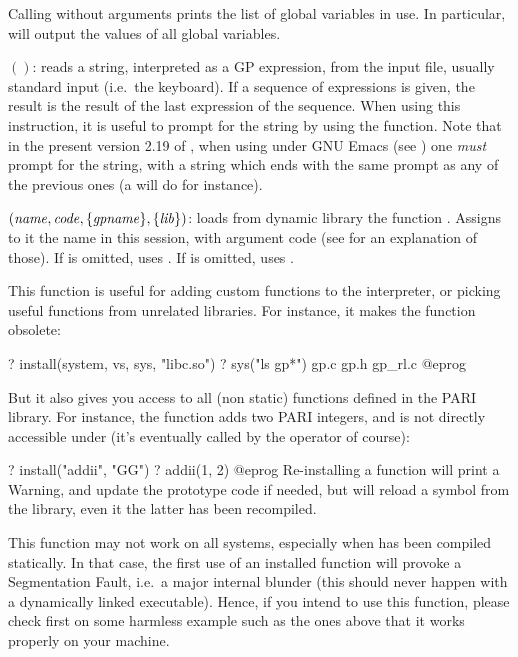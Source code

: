 Calling  without arguments prints the list of global variables in
use. In particular,  will output the values of all global
variables.

$()$: reads a string, interpreted as a GP expression,
from the input file, usually standard input (i.e.~the keyboard). If a
sequence of expressions is given, the result is the result of the last
expression of the sequence. When using this instruction, it is useful to
prompt for the string by using the  function. Note that in the
present version 2.19 of , when using  under GNU Emacs (see
) one \emph{must} prompt for the string, with a string
which ends with the same prompt as any of the previous ones (a 
will do for instance).

$(\hbox{\it name\/},\hbox{\it code\/},\{\hbox{\it gpname\/}\},\{\hbox{\it lib\/}\})$:
loads from dynamic library  the function . Assigns to it
the name  in this  session, with argument code  (see
 for an explanation of those). If  is
omitted, uses . If  is omitted, uses
.\label{se:install}

This function is useful for adding custom functions to the  interpreter,
or picking useful functions from unrelated libraries. For instance, it
makes the function  obsolete:

\bprog
? install(system, vs, sys, "libc.so")
? sys("ls gp*")
gp.c            gp.h            gp_rl.c
@eprog

But it also gives you access to all (non static) functions defined in the
PARI library. For instance, the function  adds
two PARI integers, and is not directly accessible under  (it's eventually
called by the \kbd{+} operator of course):

\bprog
? install("addii", "GG")
? addii(1, 2)
@eprog
Re-installing a function will print a Warning, and update the prototype code
if needed, but will reload a symbol from the library, even it the latter has
been recompiled.

 This function may not work on all systems, especially
when  has been compiled statically. In that case, the first use of an
installed function will provoke a Segmentation Fault, i.e.~a major internal
blunder (this should never happen with a dynamically linked executable).
Hence, if you intend to use this function, please check first on some
harmless example such as the ones above that it works properly on your
machine.

